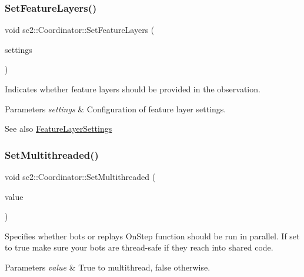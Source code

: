 \subsubsection{\texorpdfstring{Set\+Feature\+Layers()}{SetFeatureLayers()}}
{\footnotesize\ttfamily void sc2\+::\+Coordinator\+::\+Set\+Feature\+Layers (\begin{DoxyParamCaption}\item[{const \hyperlink{structsc2_1_1_feature_layer_settings}{Feature\+Layer\+Settings} \&}]{settings }\end{DoxyParamCaption})}

Indicates whether feature layers should be provided in the observation. 
\begin{DoxyParams}{Parameters}
{\em settings} & Configuration of feature layer settings. \\
\hline
\end{DoxyParams}
\begin{DoxySeeAlso}{See also}
\hyperlink{structsc2_1_1_feature_layer_settings}{Feature\+Layer\+Settings} 
\end{DoxySeeAlso}
\mbox{\label{classsc2_1_1_coordinator_a555587bc85ac437711d15b569c75181a}} 
\subsubsection{\texorpdfstring{Set\+Multithreaded()}{SetMultithreaded()}}
{\footnotesize\ttfamily void sc2\+::\+Coordinator\+::\+Set\+Multithreaded (\begin{DoxyParamCaption}\item[{bool}]{value }\end{DoxyParamCaption})}

Specifies whether bots or replays On\+Step function should be run in parallel. If set to true make sure your bots are thread-\/safe if they reach into shared code. 
\begin{DoxyParams}{Parameters}
{\em value} & True to multithread, false otherwise. \\
\hline
\end{DoxyParams}
\mbox{\label{classsc2_1_1_coordinator_aaad48921bac2f4f84471de5e9cff75d5}} 
